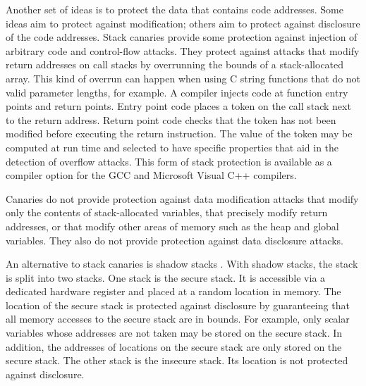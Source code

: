 Another set of ideas is to protect the data that contains 
code addresses.  Some ideas aim to protect against modification;
others aim to protect against disclosure of the code addresses.
Stack canaries \cite{Cowan1998, Dang2015, Petsios2015} provide 
some protection against injection of 
arbitrary code and control-flow attacks.
They protect against attacks that modify return addresses
on call stacks by overrunning the bounds of a stack-allocated array.  
This kind of overrun can happen when using C string functions that do
not valid parameter lengths, for example.   A
compiler injects code at function entry points and return
points. Entry point code places a token on the call stack
next to the return address.  Return point code checks that
the token has not been modified before executing the return
instruction.  The value of the token may be computed at run time
and selected to have specific properties that aid in the detection
of overflow attacks.  This form of stack protection is available as a
compiler option for the GCC and Microsoft Visual C++ compilers.

Canaries do not provide protection against data modification attacks
that modify only the contents of stack-allocated variables, that
precisely modify return addresses, or that modify other areas 
of memory such as the heap and global variables. They also do not
provide protection against data disclosure attacks. 

An alternative to stack canaries is shadow stacks \cite{Abadi2005, 
Baratloo2000, Bhatkar2005, Chiueh2001, Corliss2005, Frantzen2001, Kuznetsov2014}.
With shadow stacks,
the stack is split into two stacks.  One stack is the secure stack. It
is accessible via a dedicated hardware register and placed at a random
location in memory.   The location of the secure stack is protected
against disclosure by guaranteeing that all memory accesses
to the secure stack are in bounds.  For example, only scalar variables whose
addresses are not taken may be stored on the secure stack. In addition, 
the addresses of locations on the secure stack are only stored on the secure
stack.   The other stack is the insecure stack.  Its location is not
protected against disclosure.

